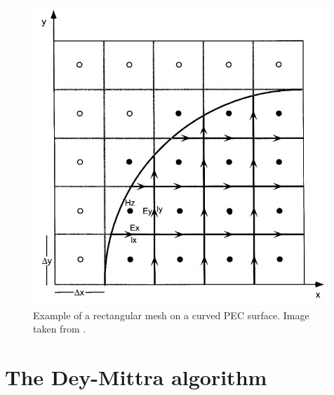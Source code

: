 \documentclass[12pt, oneside]{book}
\begin{document}
\begin{figure}[H]
    \centering
    \includegraphics[scale=1.0]{Imagenes/DeyMittra_2DMeshExample.jpg}
    \caption{Example of a rectangular mesh on a curved PEC surface. Image taken from \cite{Dey1997ALC}.}
    \label{fig:DeyMittraMesh}
\end{figure}

\section{The Dey-Mittra algorithm}
\end{document}
